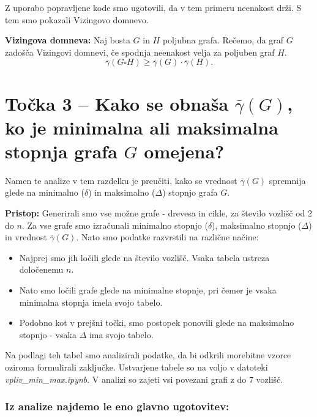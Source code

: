 \documentclass[a4paper, 12pt]{article}
\begin{document}
 \noindent Z uporabo popravljene kode smo ugotovili, da v tem primeru neenakost drži. S tem smo pokazali Vizingovo domnevo.

\noindent \textbf{Vizingova domneva:} Naj bosta \(G\) in \(H\) poljubna grafa. Rečemo, da graf \(G\) zadošča Vizingovi domnevi, če spodnja neenakost velja za poljuben graf \(H\). 
\[
\overline{\gamma}(G \square H) \geq \overline{\gamma}(G) \cdot \overline{\gamma}(H).
\]






\newpage

\section*{Točka 3 –  Kako se obnaša $\overline\gamma(G)$, ko je minimalna ali maksimalna stopnja grafa \( G \) omejena?}

Namen te analize v tem razdelku je preučiti, kako se vrednost $\overline{\gamma}(G)$ spremnija glede na minimalno ($\delta$) in maksimalno ($\Delta$) stopnjo grafa $G$.

\noindent \textbf{Pristop:} Generirali smo vse možne grafe - drevesa in cikle, za število vozlišč od 2 do $n$. Za vse grafe smo izračunali minimalno stopnjo ($\delta$), maksimalno stopnjo ($\Delta$) in vrednost $\overline{\gamma}(G)$. Nato smo podatke razvrstili na različne načine:

\begin{itemize}

    \item Najprej smo jih ločili glede na število vozlišč. Vsaka tabela ustreza določenemu $n$.

    \item Nato smo ločili grafe glede na minimalne stopnje, pri čemer je vsaka minimalna stopnja imela svojo tabelo.

    \item Podobno kot v prejšni točki, smo postopek ponovili glede na maksimalno stopnjo - vsaka $\Delta$ ima svojo tabelo.
     
\end{itemize}    


\noindent Na podlagi teh tabel smo analizirali podatke, da bi odkrili morebitne vzorce oziroma formulirali zaključke. Ustvarjene tabele so na voljo v datoteki \textit{vpliv\_min\_max.ipynb}. V analizi so zajeti vsi povezani grafi z do 7 vozlišč.



\subsubsection*{Iz analize najdemo le eno glavno ugotovitev:}
\end{document}
